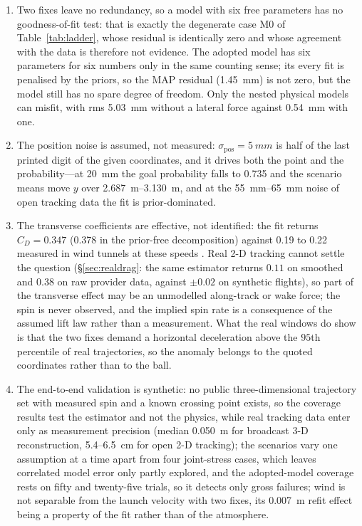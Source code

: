 \begin{enumerate}[label=W\arabic*,font=\bfseries,leftmargin=*,itemsep=3pt]
  \item Two fixes leave no redundancy, so a model with six free parameters has
        no goodness-of-fit test: that is exactly the degenerate case M0 of
        Table~\ref{tab:ladder}, whose residual is identically zero and whose
        agreement with the data is therefore not evidence. The adopted model has
        six parameters for six numbers only in the same counting sense; its
        every fit is penalised by the priors, so the MAP residual
        (\SI{1.45}{mm}) is not zero, but the model still has no spare degree of
        freedom. Only the nested physical models can misfit, with rms
        \SI{5.03}{mm} without a lateral force against \SI{0.54}{mm} with one.
  \item The position noise is assumed, not measured: $\sigma_{\text{pos}} =
        \SI{5}{mm}$ is half of the last printed digit of the given
        coordinates, and it drives both the point and the probability---at
        \SI{20}{mm} the goal probability falls to \num{0.735} and the scenario
        means move $y$ over \SIrange{2.687}{3.130}{m}, and at the
        \SIrange{55}{65}{mm} noise of open tracking data the fit is
        prior-dominated.
  \item The transverse coefficients are effective, not identified: the fit
        returns $C_D=\num{0.347}$ (\num{0.378} in the prior-free
        decomposition) against \num{0.19} to \num{0.22} measured in wind
        tunnels at these speeds \citep{carre2005,goff2012}. Real 2-D tracking
        cannot settle the question (\S\ref{sec:realdrag}: the same estimator
        returns $0.11$ on smoothed and $0.38$ on raw provider data, against
        $\pm0.02$ on synthetic flights), so part of the transverse effect may be
        an unmodelled along-track or wake force; the spin is never observed, and
        the implied spin rate is a consequence of the assumed lift law rather
        than a measurement. What the real windows do show is that the two fixes
        demand a horizontal deceleration above the $95$th percentile of real
        trajectories, so the anomaly belongs to the quoted coordinates rather
        than to the ball.
  \item The end-to-end validation is synthetic: no public three-dimensional
        trajectory set with measured spin and a known crossing point exists, so
        the coverage results test the estimator and not the physics, while real
        tracking data enter only as measurement precision (median \SI{0.050}{m}
        for broadcast 3-D reconstruction, \SI{5.4}{}--\SI{6.5}{cm} for open 2-D
        tracking); the scenarios
        vary one assumption at a time apart from four joint-stress cases, which
        leaves correlated model error only partly explored, and the adopted-model
        coverage rests on fifty and twenty-five trials, so it detects only gross
        failures; wind is not separable from the launch velocity with two fixes,
        its \SI{0.007}{m} refit effect being a property of the fit rather than of
        the atmosphere.
\end{enumerate}
